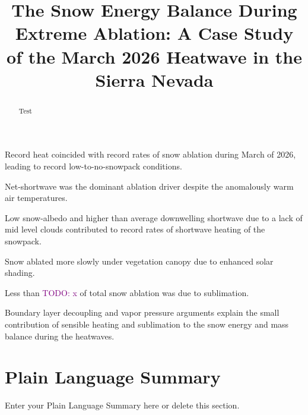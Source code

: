 \documentclass[draft]{agujournal2019}
\newcommand{\todo}[1]{\textcolor{purple}{TODO: #1}}      %
\begin{document}
\title{The Snow Energy Balance During Extreme Ablation: A Case Study of the March 2026 Heatwave in the Sierra Nevada}




\begin{keypoints}
\item Record heat coincided with record rates of snow ablation during March of 2026, leading to record low-to-no-snowpack conditions.
\item Net-shortwave was the dominant ablation driver despite the anomalously warm air temperatures. 
\item Low snow-albedo and higher than average downwelling shortwave due to a lack of mid level clouds contributed to record rates of shortwave heating of the snowpack.
\item Snow ablated more slowly under vegetation canopy due to enhanced solar shading. 
\item Less than \todo{x} of total snow ablation was due to sublimation.
\item Boundary layer decoupling and vapor pressure arguments explain the small contribution of sensible heating and sublimation to the snow energy and mass balance during the heatwaves.

\end{keypoints}

\begin{abstract}
Test
\end{abstract}

\section*{Plain Language Summary}
Enter your Plain Language Summary here or delete this section.
\end{document}

